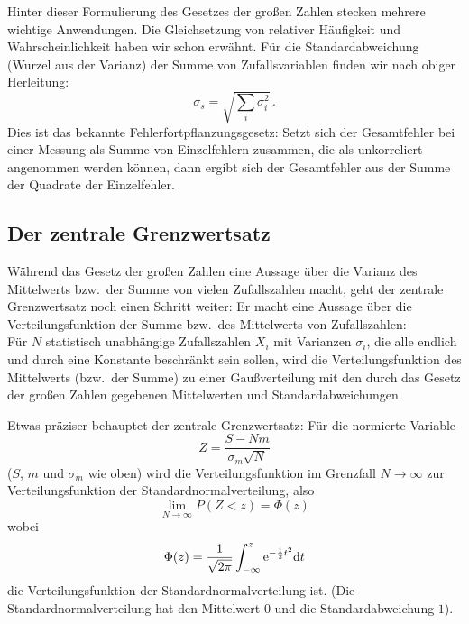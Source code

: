 Hinter dieser Formulierung des Gesetzes
der gro\ss en Zahlen stecken mehrere wichtige
Anwendungen. Die Gleichsetzung von relativer
H\"aufigkeit und Wahrscheinlichkeit haben wir
schon erw\"ahnt. F\"ur die Standardabweichung
(Wurzel aus der Varianz) der Summe von 
Zufallsvariablen finden wir nach obiger
Herleitung:
\begin{equation}
     \sigma_s = \sqrt{ \sum_i \sigma_i^2} \, . 
\end{equation}
Dies ist das bekannte Fehlerfortpflanzungsgesetz:
Setzt sich der Gesamtfehler bei einer Messung
als Summe von Einzelfehlern zusammen, die
als unkorreliert angenommen werden k\"onnen,
dann ergibt sich der Gesamtfehler
aus der Summe der Quadrate der Einzelfehler. 

\subsection{Der zentrale Grenzwertsatz}

W\"ahrend das Gesetz der gro\ss en Zahlen
eine Aussage \"uber die Varianz des Mittelwerts
bzw.\ der Summe von vielen Zufallszahlen
macht, geht der zentrale Grenzwertsatz
noch einen Schritt weiter: Er macht eine
Aussage \"uber die Verteilungsfunktion der
Summe bzw.\ des Mittelwerts von Zufallszahlen:\\[0.2cm]
F\"ur $N$ statistisch unabh\"angige Zufallszahlen 
$X_i$ mit Varianzen $\sigma_i$, die alle endlich
und durch eine Konstante beschr\"ankt sein 
sollen, wird die
Verteilungsfunktion des Mittelwerts (bzw.\
der Summe) zu einer Gau\ss verteilung
mit den durch das Gesetz der gro\ss en Zahlen
gegebenen Mittelwerten und Standardabweichungen.
\vspace{0.2cm}

Etwas pr\"aziser behauptet der zentrale
Grenzwertsatz: F\"ur die normierte Variable
\begin{equation}
       Z = \frac{S-Nm}{\sigma_m \sqrt{N}}  
\end{equation}
($S$, $m$ und $\sigma_m$ wie oben) wird
die Verteilungsfunktion im Grenzfall $N\rightarrow
\infty$ zur Verteilungsfunktion der
Standardnormalverteilung, also
\begin{equation}
    \lim_{N\rightarrow \infty} P(Z<z) = \Phi(z) 
\end{equation}
wobei 
\begin{equation}
     \Phi(z) =  \frac{1}{\sqrt{2\pi}} \int_{-\infty}^z
       {\rm e}^{- \frac{1}{2} t^2} {\rm d} t 
\end{equation}
die Verteilungsfunktion der Standardnormalverteilung
ist. (Die Standardnormalverteilung hat den
Mittelwert $0$ und die Standardabweichung $1$). 

